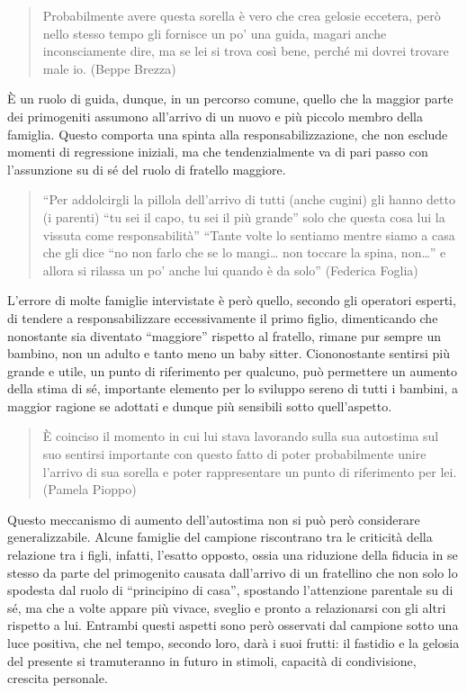 \documentclass[12pt,oneside,svgnames]{memoir}
\newenvironment{quotationb}%
{\color{maincolor}\begin{leftbar}\begin{quotation}}%
{\end{quotation}\end{leftbar}\ignorespacesafterend}
\begin{document}
\begin{quotationb}
Probabilmente avere questa sorella è vero che crea gelosie eccetera,
però nello stesso tempo gli fornisce un po' una guida, magari anche
inconsciamente dire, ma se lei si trova così bene, perché mi dovrei
trovare male io. (Beppe Brezza)
\end{quotationb}

È un ruolo di guida, dunque, in un percorso comune, quello che la
maggior parte dei primogeniti assumono all'arrivo di un nuovo e più
piccolo membro della famiglia. Questo comporta una spinta alla
responsabilizzazione, che non esclude momenti di regressione iniziali,
ma che tendenzialmente va di pari passo con l'assunzione su di sé del
ruolo di fratello maggiore.

\begin{quotationb}
``Per addolcirgli la pillola dell'arrivo di tutti (anche cugini) gli
hanno detto (i parenti) ``tu sei il capo, tu sei il più grande'' solo
che questa cosa lui la vissuta come responsabilità'' ``Tante volte lo
sentiamo mentre siamo a casa che gli dice ``no non farlo che se lo
mangi\ldots{} non toccare la spina, non\ldots{}'' e allora si rilassa un
po' anche lui quando è da solo'' (Federica Foglia)
\end{quotationb}

L'errore di molte famiglie intervistate è però quello, secondo gli
operatori esperti, di tendere a responsabilizzare eccessivamente il
primo figlio, dimenticando che nonostante sia diventato ``maggiore''
rispetto al fratello, rimane pur sempre un bambino, non un adulto e
tanto meno un baby sitter. Ciononostante sentirsi più grande e utile, un
punto di riferimento per qualcuno, può permettere un aumento della stima
di sé, importante elemento per lo sviluppo sereno di tutti i bambini, a
maggior ragione se adottati e dunque più sensibili sotto quell'aspetto.

\begin{quotationb}
È coinciso il momento in cui lui stava lavorando sulla sua autostima sul
suo sentirsi importante con questo fatto di poter probabilmente unire
l'arrivo di sua sorella e poter rappresentare un punto di riferimento
per lei. (Pamela Pioppo)
\end{quotationb}

Questo meccanismo di aumento dell'autostima non si può però considerare
generalizzabile. Alcune famiglie del campione riscontrano tra le
criticità della relazione tra i figli, infatti, l'esatto opposto, ossia
una riduzione della fiducia in se stesso da parte del primogenito
causata dall'arrivo di un fratellino che non solo lo spodesta dal ruolo
di ``principino di casa'', spostando l'attenzione parentale su di sé, ma
che a volte appare più vivace, sveglio e pronto a relazionarsi con gli
altri rispetto a lui. Entrambi questi aspetti sono però osservati dal
campione sotto una luce positiva, che nel tempo, secondo loro, darà i
suoi frutti: il fastidio e la gelosia del presente si tramuteranno in
futuro in stimoli, capacità di condivisione, crescita personale.
\end{document}
